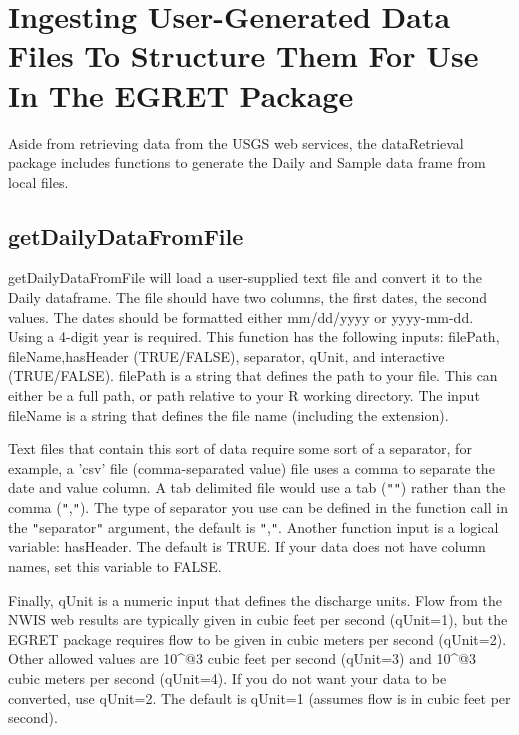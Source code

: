 \documentclass[a4paper,11pt]{article}
\begin{document}
\newpage
\section{Ingesting User-Generated Data Files To Structure Them For Use In The EGRET Package}
Aside from retrieving data from the USGS web services, the dataRetrieval package includes functions to generate the Daily and Sample data frame from local files.

\subsection{getDailyDataFromFile}
getDailyDataFromFile will load a user-supplied text file and convert it to the Daily dataframe. The file should have two columns, the first dates, the second values.  The dates should be formatted either mm/dd/yyyy or yyyy-mm-dd. Using a 4-digit year is required. This function has the following inputs: filePath, fileName,hasHeader (TRUE/FALSE), separator, qUnit, and interactive (TRUE/FALSE). filePath is a string that defines the path to your file. This can either be a full path, or path relative to your R working directory. The input fileName is a string that defines the file name (including the extension).

Text files that contain this sort of data require some sort of a separator, for example, a 'csv' file (comma-separated value) file uses a comma to separate the date and value column. A tab delimited file would use a tab (\texttt{"}\verb@\t@\texttt{"}) rather than the comma (\texttt{"},\texttt{"}). The type of separator you use can be defined in the function call in the \texttt{"}separator\texttt{"} argument, the default is \texttt{"},\texttt{\texttt{"}}. Another function input is a logical variable: hasHeader.  The default is TRUE. If your data does not have column names, set this variable to FALSE.

Finally, qUnit is a numeric input that defines the discharge units. Flow from the NWIS web results are typically given in cubic feet per second (qUnit=1), but the EGRET package requires flow to be given in cubic meters per second (qUnit=2). Other allowed values are 10\verb@^@3 cubic feet per second (qUnit=3) and 10\verb@^@3 cubic meters per second (qUnit=4). If you do not want your data to be converted, use qUnit=2. The default is qUnit=1 (assumes flow is in cubic feet per second).
\end{document}
